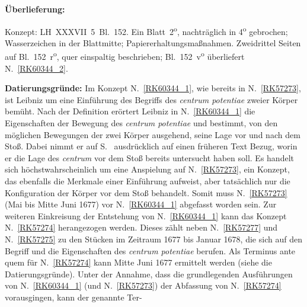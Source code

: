%  
%
%
%
%
%
\frenchspacing
%
\begin{ledgroupsized}[r]{120mm}
\footnotesize
\pstart
\noindent\textbf{Überlieferung:}
\pend
\end{ledgroupsized}
%
\begin{ledgroupsized}[r]{114mm}
\footnotesize
\pstart \parindent -6mm
%
Konzept:
LH~XXXVII~5~Bl.~152. 
Ein Blatt~2\textsuperscript{o},
nachträglich in 4\textsuperscript{o} gebrochen;
Wasserzeichen in der Blattmitte;
Papiererhaltungsmaßnahmen.
Zweidrittel Seiten auf Bl.~152~r\textsuperscript{o}, quer einspaltig beschrieben;
Bl.~152~v\textsuperscript{o} überliefert N.~\ref{RK60344_2}.
\pend
\end{ledgroupsized}
%
\vspace{5mm}
\begin{ledgroup}
\footnotesize
\pstart
\noindent%
\textbf{Datierungsgründe:}
Im Konzept N.~\ref{RK60344_1}, wie bereits in N.~\ref{RK57273},
%
ist Leibniz um eine Einführung des Begriffs des \textit{centrum potentiae} zweier Körper bemüht.
%
Nach der Definition erörtert Leibniz in N.~\ref{RK60344_1} die Eigenschaften der Bewegung des \textit{centrum potentiae}
%
und bestimmt, von den möglichen Bewegungen der zwei Körper ausgehend,
%
seine Lage vor und nach dem Stoß.
%
Dabei nimmt er auf S.~ 
%
ausdrücklich auf einen früheren Text Bezug, worin er die Lage des \textit{centrum} vor dem Stoß
%
bereits untersucht haben soll. Es handelt sich höchstwahrscheinlich um eine Anspielung auf N.~\ref{RK57273},
%
ein Konzept, das ebenfalls die Merkmale einer Einführung aufweist, 
%
aber tatsächlich nur die Konfiguration der Körper vor dem Stoß behandelt.
%
Somit muss N.~\ref{RK57273} (Mai bis Mitte Juni 1677) vor N.~\ref{RK60344_1} abgefasst worden sein.
\pend
%
\pstart
Zur weiteren Einkreisung der Entstehung von N.~\ref{RK60344_1} kann das Konzept N.~\ref{RK57274} herangezogen werden.
%
Dieses zählt neben N.~\ref{RK57277} und N.~\ref{RK57275} zu den Stücken im Zeitraum 1677 bis Januar 1678, die 
sich auf den Begriff und die Eigenschaften des \textit{centrum potentiae} berufen.
%
Als Terminus ante quem für N.~\ref{RK57274} kann  Mitte Juni 1677 ermittelt werden (siehe die Datierungsgründe). 
%
Unter der Annahme, dass die grundlegenden Ausführungen von N.~\ref{RK60344_1} 
%
(und N.~\ref{RK57273}) der Abfassung von N.~\ref{RK57274} vorausgingen, 
%
kann der genannte Ter- 
\pend
\end{ledgroup}
